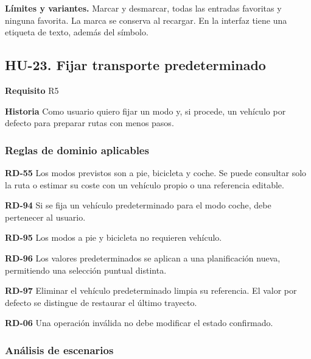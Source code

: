 {\fontsize{9}{11.8}\selectfont\textbf{Límites y variantes.} Marcar y desmarcar, todas las entradas favoritas y ninguna favorita. La marca se conserva al recargar. En la interfaz tiene una etiqueta de texto, además del símbolo.\par}\vspace{4pt}
\clearpage\subsection*{HU-23. Fijar transporte predeterminado}

\textbf{Requisito} R5\par

\textbf{Historia} Como usuario quiero fijar un modo y, si procede, un vehículo por defecto para preparar rutas con menos pasos.\par

\subsubsection*{Reglas de dominio aplicables}

\textbf{RD-55} Los modos previstos son a pie, bicicleta y coche. Se puede consultar solo la ruta o estimar su coste con un vehículo propio o una referencia editable.\par

\textbf{RD-94} Si se fija un vehículo predeterminado para el modo coche, debe pertenecer al usuario.\par

\textbf{RD-95} Los modos a pie y bicicleta no requieren vehículo.\par

\textbf{RD-96} Los valores predeterminados se aplican a una planificación nueva, permitiendo una selección puntual distinta.\par

\textbf{RD-97} Eliminar el vehículo predeterminado limpia su referencia. El valor por defecto se distingue de restaurar el último trayecto.\par

\textbf{RD-06} Una operación inválida no debe modificar el estado confirmado.\par

\subsubsection*{Análisis de escenarios}

